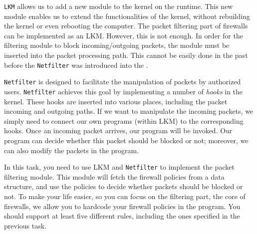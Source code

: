 {\tt LKM} allows us to add a new module to the kernel on the runtime. 
This new module enables us to extend the functionalities of the kernel,
without rebuilding the kernel or even rebooting the computer. 
The packet filtering part of firewalls can be implemented 
as an LKM. However, this is not enough. In order for the filtering module to 
block incoming/outgoing packets, the module 
must be inserted into the packet processing path. 
This cannot be easily done in the past before 
the {\tt Netfilter} was introduced into the \linux.


{\tt Netfilter} is designed to facilitate the manipulation of 
packets by authorized users. {\tt Netfilter} achieves this 
goal by implementing a number of {\em hooks} in the 
\linux kernel. These hooks are inserted into various places, 
including the packet incoming and outgoing paths. 
If we want to manipulate the incoming packets, we simply
need to connect our own programs (within LKM) to the 
corresponding hooks. Once an incoming packet arrives, 
our program will be invoked. Our program can decide 
whether this packet should be blocked or not; moreover,
we can also modify the packets in the program.


In this task, you need to use LKM and {\tt Netfilter} to implement
the packet filtering module.  This module will fetch 
the firewall policies from a data structure, and use the 
policies to decide whether packets should be blocked or not.
To make your life easier, so you can focus on the filtering part, 
the core of firewalls, we allow you to hardcode your firewall policies 
in the program. You should support at least five different 
rules, including the ones specified in the previous task. 



